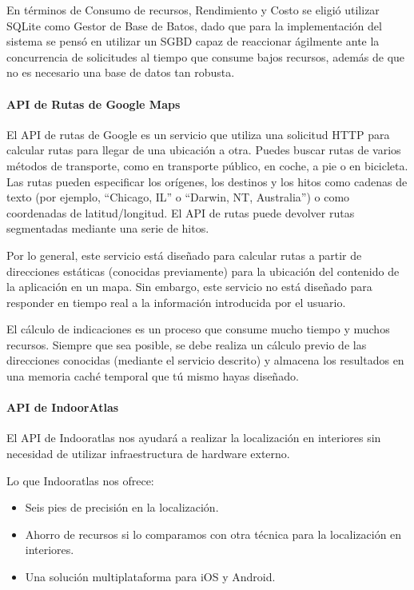 En términos de Consumo de recursos, Rendimiento y Costo se eligió utilizar SQLite como Gestor de Base de Batos, dado que para la implementación del sistema se pensó en utilizar un SGBD capaz de reaccionar ágilmente ante la concurrencia de solicitudes al tiempo que consume bajos recursos, además de que no es necesario una base de datos tan robusta.

\paragraph{API de Rutas de Google Maps}

El API de rutas de Google es un servicio que utiliza una solicitud HTTP para calcular rutas para llegar de una ubicación a otra. Puedes buscar rutas de varios métodos de transporte, como en transporte público, en coche, a pie o en bicicleta. Las rutas pueden especificar los orígenes, los destinos y los hitos como cadenas de texto (por ejemplo, ``Chicago, IL'' o ``Darwin, NT, Australia'') o como coordenadas de latitud/longitud. El API de rutas puede devolver rutas segmentadas mediante una serie de hitos.

Por lo general, este servicio está diseñado para calcular rutas a partir de direcciones estáticas (conocidas previamente) para la ubicación del contenido de la aplicación en un mapa. Sin embargo, este servicio no está diseñado para responder en tiempo real a la información introducida por el usuario.

El cálculo de indicaciones es un proceso que consume mucho tiempo y muchos recursos. Siempre que sea posible, se debe realiza un cálculo previo de las direcciones conocidas (mediante el servicio descrito) y almacena los resultados en una memoria caché temporal que tú mismo hayas diseñado. \cite{apiGoogleMaps}

\paragraph{API de IndoorAtlas}

El API de Indooratlas nos ayudará a realizar la localización en interiores sin necesidad de utilizar infraestructura de hardware externo. \cite{apiIndoorAtlas}

Lo que Indooratlas nos ofrece:

\begin{itemize}
	\item Seis pies de precisión en la localización.
	\item	Ahorro de recursos si lo comparamos con otra técnica para la localización en interiores.
	\item Una solución multiplataforma para iOS y Android.
\end{itemize}

